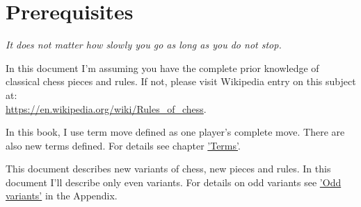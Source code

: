 
\chapter*{Prerequisites}

\begin{flushright}
\parbox{0.7\textwidth}{
\emph{It does not matter how slowly you go as long as you do not stop. \\
 } }
\end{flushright}

\noindent
In this document I'm assuming you have the complete prior knowledge of classical chess pieces and rules.
If not, please visit Wikipedia entry on this subject at: \\
\href{https://en.wikipedia.org/wiki/Rules\_of\_chess}{https://en.wikipedia.org/wiki/Rules\_of\_chess}.

In this book, I use term move defined as one player's complete move. There are also new terms defined.
For details see chapter \hyperref[ch:Terms]{'Terms'}.

This document describes new variants of chess, new pieces and rules. In this document I'll describe only
even variants. For details on odd variants see \hyperref[sec:Appendix/Odd variants]{'Odd variants'} in the Appendix.

\clearpage %
